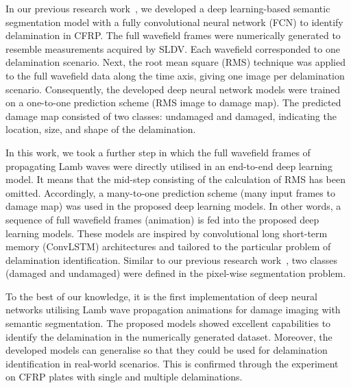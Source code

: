 In our previous research work~\cite{Ijjeh2021}, we developed a deep learning-based semantic segmentation model with a fully convolutional neural network (FCN) to identify delamination in CFRP.
The full wavefield frames were numerically generated to resemble measurements acquired by SLDV.
Each wavefield corresponded to one delamination scenario.
Next, the root mean square (RMS) technique was applied to the full wavefield data along the time axis, giving one image per delamination scenario.
Consequently, the developed deep neural network models were trained on a one-to-one prediction scheme (RMS image to damage map).
The predicted damage map consisted of two classes: undamaged and damaged, indicating the location, size, and shape of the delamination.

In this work, we took a further step in which the full wavefield frames of propagating Lamb waves were directly utilised in an end-to-end
deep learning model.
It means that the mid-step consisting of the calculation of RMS has been omitted.
Accordingly, a many-to-one prediction scheme (many input frames to damage map) was used in the proposed deep learning models.
In other words, a sequence of full wavefield frames (animation) is fed into the proposed deep learning models.
These models are inspired by convolutional long short-term memory (ConvLSTM) architectures and tailored to the particular problem of delamination identification.
Similar to our previous research work~\cite{Ijjeh2021}, two classes (damaged and undamaged) were defined in the pixel-wise segmentation problem.

To the best of our knowledge, it is the first implementation of deep neural networks utilising Lamb wave propagation animations for damage imaging with semantic segmentation. 
The proposed models showed excellent capabilities to identify the delamination in the numerically generated dataset.
Moreover, the developed models can generalise so that they could be used for delamination identification in real-world scenarios.
This is confirmed through the experiment on CFRP plates with single and multiple delaminations.
